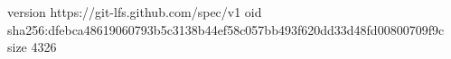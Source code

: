 version https://git-lfs.github.com/spec/v1
oid sha256:dfebca48619060793b5c3138b44ef58c057bb493f620dd33d48fd00800709f9c
size 4326
